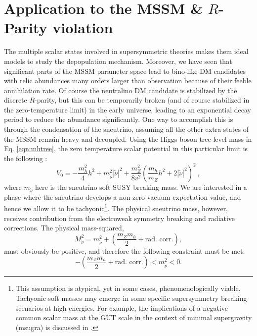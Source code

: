 \section{Application to the MSSM \& $R$-Parity violation}
\label{sec:MSSMapp}
The multiple scalar states involved in supersymmetric theories makes them ideal models to study the depopulation mechanism. Moreover, we have seen that significant parts of the MSSM parameter space lead to bino-like DM candidates with relic abundances many orders larger than observation because of their feeble annihilation rate. Of course the neutralino DM candidate is stabilized by the discrete $R$-parity, but this can be temporarily broken (and of course stabilized in the zero-temperature limit) in the early universe, leading to an exponential decay period to reduce the abundance significantly. One way to accomplish this is through the condensation of the sneutrino, assuming all the other extra states of the MSSM remain heavy and decoupled. Using the Higgs boson tree-level mass in Eq. \ref{eqn:mhtree}, the zero temperature scalar potential in this particular limit is the following \cite{RN793}: 
\begin{equation}
V_0=-\frac{m_h^2}{4}h^2+m^2_{\tilde \nu}|\tilde \nu|^2+\frac{m_Z^2}{8v^2}\left(\frac{m_h}{m_Z}h^2+2|\tilde \nu|^2\right)^2~, \label{eqn:sneutrinopot}
\end{equation}
where $m_{\tilde \nu}$ here is the sneutrino soft SUSY breaking mass. We are interested in a phase where the sneutrino develops a non-zero vacuum expectation value, and hence we allow it to be tachyonic\footnote{This assumption is atypical, yet in some cases, phenomenologically viable. Tachyonic soft masses may emerge in some specific supersymmetry breaking scenarios at high energies. For example, the implications of a negative common scalar mass at the GUT scale in the context of minimal supergravity (\acrshort{msugra}) is discussed in \cite{RN768}.}. The physical sneutrino mass, however, receives contribution from the electroweak symmetry breaking and radiative corrections. The physical mass-squared, 
\begin{equation}
M_{\tilde \nu}^2=m_{\tilde \nu}^2+\left(\frac{m_Zm_h}{2} + \text{rad. corr.}\right),
\end{equation}
must obviously be positive, and therefore the following constraint must be met: 
\begin{equation}
-\left(\frac{m_Zm_h}{2} + \text{rad. corr.}\right)< m_{\tilde \nu}^2< 0.
\end{equation}

